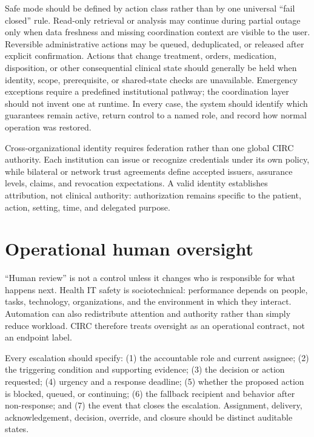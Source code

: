 \documentclass[10pt]{article}
\begin{document}
Safe mode should be defined by action class rather than by one universal ``fail closed'' rule.
Read-only retrieval or analysis may continue during partial outage only when data freshness and
missing coordination context are visible to the user. Reversible administrative actions may be
queued, deduplicated, or released after explicit confirmation. Actions that change treatment, orders,
medication, disposition, or other consequential clinical state should generally be held when identity,
scope, prerequisite, or shared-state checks are unavailable. Emergency exceptions require a
predefined institutional pathway; the coordination layer should not invent one at runtime. In every
case, the system should identify which guarantees remain active, return control to a named role, and
record how normal operation was restored.

Cross-organizational identity requires federation rather than one global CIRC authority. Each
institution can issue or recognize credentials under its own policy, while bilateral or network trust
agreements define accepted issuers, assurance levels, claims, and revocation expectations. A valid
identity establishes attribution, not clinical authority: authorization remains specific to the
patient, action, setting, time, and delegated purpose.

\section{Operational human oversight}

``Human review'' is not a control unless it changes who is responsible for what happens next. Health
IT safety is sociotechnical: performance depends on people, tasks, technology, organizations, and the
environment in which they interact.\cite{sittig2010sociotechnical,carayon2006seips} Automation can
also redistribute attention and authority rather than simply reduce workload.\cite{parasuraman2000automation}
CIRC therefore treats oversight as an operational contract, not an endpoint label.

Every escalation should specify: (1) the accountable role and current assignee; (2) the triggering
condition and supporting evidence; (3) the decision or action requested; (4) urgency and a response
deadline; (5) whether the proposed action is blocked, queued, or continuing; (6) the fallback recipient
and behavior after non-response; and (7) the event that closes the escalation. Assignment, delivery,
acknowledgement, decision, override, and closure should be distinct auditable states.
\end{document}
